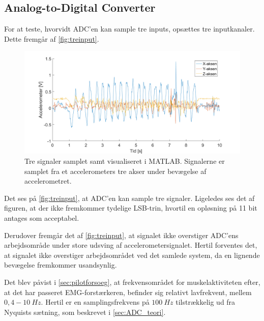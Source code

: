 \subsection{Analog-to-Digital Converter}

For at teste, hvorvidt ADC'en kan sample tre inputs, opsættes tre inputkanaler. 
Dette fremgår af \autoref{fig:treinput}.

\begin{figure}[H]
\centering
\includegraphics[width=1\textwidth]{figures/treinput}
\caption{Tre signaler samplet samt visualiseret i MATLAB. Signalerne er samplet fra et accelerometers tre akser under bevægelse af accelerometret.}
\label{fig:treinput}
\end{figure}

\noindent
Det ses på \autoref{fig:treinput}, at ADC'en kan sample tre signaler. 
Ligeledes ses det af figuren, at der ikke fremkommer tydelige LSB-trin, hvortil en opløsning på 11 bit antages som acceptabel.

Derudover fremgår det af \autoref{fig:treinput}, at signalet ikke overstiger ADC'ens arbejdsområde under store udsving af accelerometersignalet. 
Hertil forventes det, at signalet ikke overstiger arbejdsområdet ved det samlede system, da en lignende bevægelse fremkommer usandsynlig. 

Det blev påvist i \autoref{sec:pilotforsoeg}, at frekvensområdet for muskelaktiviteten efter, at det har passeret EMG-forstærkeren, befinder sig relativt lavfrekvent, mellem $0,4-10~Hz$. 
Hertil er en samplingsfrekvens på $100~Hz$  tilstrækkelig ud fra Nyquists sætning, som beskrevet i \autoref{sec:ADC_teori}.


